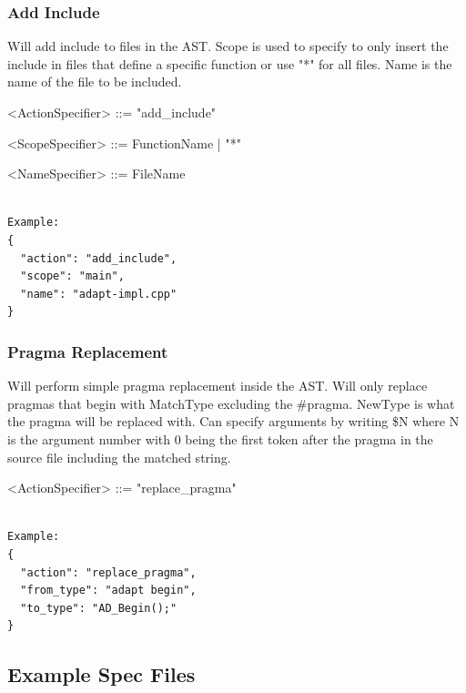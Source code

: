 \documentclass[natbib]{article}
\begin{document}
\subsubsection{Add Include}
Will add include to files in the AST. Scope is used to specify  to
only insert the include in files that define a specific function or use "*" for all files. 
Name is the name of the file to be included.

\begin{grammar}
<ActionSpecifier> ::= "add_include"

<ScopeSpecifier>     ::=  FunctionName | "*"

<NameSpecifier>     ::= FileName
\end{grammar}
\begin{verbatim}

Example:
{
  "action": "add_include",
  "scope": "main",
  "name": "adapt-impl.cpp"
}
\end{verbatim}

\subsubsection{Pragma Replacement} 
Will perform simple pragma replacement inside the AST. Will only 
replace pragmas that begin with MatchType excluding the \#pragma. NewType is what the 
pragma will be replaced with. Can specify arguments by writing \$N where N is the argument 
number with 0 being the first token after the pragma in the source file including the matched string.

\begin{grammar}
<ActionSpecifier>  ::= "replace_pragma"
\end{grammar}
\begin{verbatim}

Example:
{
  "action": "replace_pragma",
  "from_type": "adapt begin",
  "to_type": "AD_Begin();"
}
\end{verbatim}

\subsection{Example Spec Files} \label{sec:expampleSpec}
\end{document}
